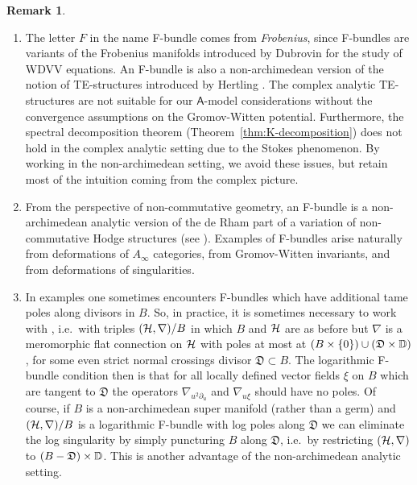 \documentclass[twoside,leqno]{article}
\numberwithin{equation}{section}
\theoremstyle{plain}
\theoremstyle{definition}
\newtheorem{remark}[equation]{Remark}
\begin{document}
\begin{remark} \label{rem:F-bundle}
\begin{enumerate}[wide]
\item[(i)] The letter $F$ in the name F-bundle comes from \emph{Frobenius}, since F-bundles are variants of the Frobenius manifolds introduced by Dubrovin \cite{Dubrovin_Geometry_of_2D} for the study of WDVV equations. An F-bundle is also a non-archimedean version of the notion of TE-structures introduced by Hertling \cite{hertling_tt*_geometry}. The complex analytic TE-structures are not suitable for our $\mathsf{A}$-model considerations without the convergence assumptions on the Gromov-Witten potential. Furthermore, the spectral decomposition theorem (Theorem~\ref{thm:K-decomposition}) does not hold in the complex analytic setting due to the Stokes phenomenon.
By working in the non-archimedean setting, we avoid these issues, but retain most of the intuition coming  from the complex picture.

\item[(ii)] From the perspective of non-commutative geometry, an F-bundle is a non-archimedean analytic version of the de Rham part of a variation of non-commutative Hodge structures (see \cite[\S2.1.5,\S2.3.1]{Katzarkov_Hodge_theoretic_aspects}).
Examples of F-bundles arise naturally from deformations of
$A_\infty$ categories, from Gromov-Witten invariants, and from deformations of singularities.

\item[(iii)] In examples one sometimes  encounters  F-bundles which have additional tame poles along divisors in $B$. So, in practice, it is sometimes necessary to work with , i.e.\  with triples  $(\mathcal H,\nabla)/B$ in which $B$ and $\mathcal H$ are as before but $\nabla$ is a meromorphic flat connection on $\mathcal H$ with poles at  most at $(B\times \{0\})\cup (\mathfrak{D}\times \mathbb D)$, for some even strict normal crossings divisor $\mathfrak{D} \subset B$. The logarithmic  F-bundle condition then is that for all locally defined vector fields $\xi$ on $B$ which are tangent to $\mathfrak{D}$ the operators  $\nabla_{u^2\partial_u}$ and $\nabla_{u\xi}$ should have no poles. Of course, if $B$ is a non-archimedean super manifold (rather than a germ) and $(\mathcal H,\nabla)/B$ is a logarithmic F-bundle with log poles along $\mathfrak{D}$ we can eliminate the log singularity by simply puncturing $B$ along $\mathfrak{D}$, i.e.\  by restricting  $(\mathcal H, \nabla)$ to $(B - \mathfrak{D})\times \mathbb D$. This is another advantage of the non-archimedean analytic setting.
\end{enumerate}
\end{remark}
\end{document}
